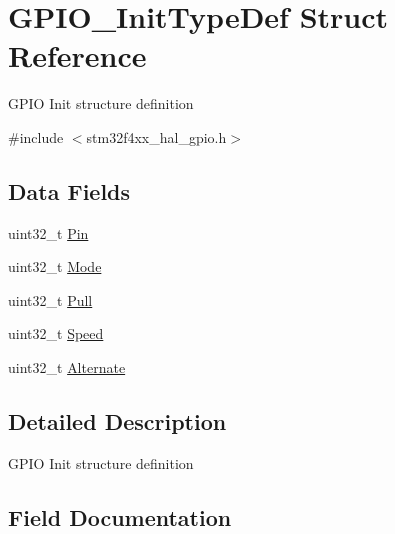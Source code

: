 \hypertarget{struct_g_p_i_o___init_type_def}{}\section{G\+P\+I\+O\+\_\+\+Init\+Type\+Def Struct Reference}
\label{struct_g_p_i_o___init_type_def}


G\+P\+IO Init structure definition ~\newline
  




{\ttfamily \#include $<$stm32f4xx\+\_\+hal\+\_\+gpio.\+h$>$}

\subsection*{Data Fields}
\begin{DoxyCompactItemize}
\item 
uint32\+\_\+t \mbox{\hyperlink{struct_g_p_i_o___init_type_def_a871d0ab74071724e96b7cc9ae2a7532b}{Pin}}
\item 
uint32\+\_\+t \mbox{\hyperlink{struct_g_p_i_o___init_type_def_a0ffc93ec511ed9cf1663f6939bd3e839}{Mode}}
\item 
uint32\+\_\+t \mbox{\hyperlink{struct_g_p_i_o___init_type_def_a6cdde08eb507b710f8179a4326548e26}{Pull}}
\item 
uint32\+\_\+t \mbox{\hyperlink{struct_g_p_i_o___init_type_def_ad04b2041f59d32492ec36a891418f3fd}{Speed}}
\item 
uint32\+\_\+t \mbox{\hyperlink{struct_g_p_i_o___init_type_def_a9a352764836bb14ec56a94f77697b52d}{Alternate}}
\end{DoxyCompactItemize}


\subsection{Detailed Description}
G\+P\+IO Init structure definition ~\newline
 

\subsection{Field Documentation}
\mbox{\label{struct_g_p_i_o___init_type_def_a9a352764836bb14ec56a94f77697b52d}} 
